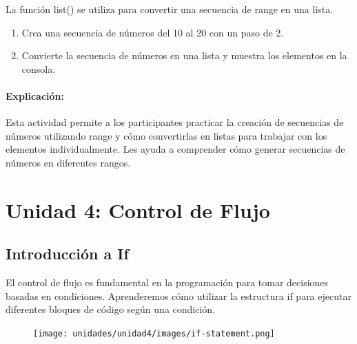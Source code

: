 \documentclass[
  a4paper,
  DIV=11,
  numbers=noendperiod,
  onepage,
  openany]{scrreprt}
\providecommand{\tightlist}{%
  \setlength{\itemsep}{0pt}\setlength{\parskip}{0pt}}\usepackage{longtable,booktabs,array}
\begin{document}
La función list() se utiliza para convertir una secuencia de range en
una lista.

\begin{tcolorbox}[enhanced jigsaw, leftrule=.75mm, bottomtitle=1mm, title=\textcolor{quarto-callout-tip-color}{\faLightbulb}\hspace{0.5em}{Actividad Práctica}, colbacktitle=quarto-callout-tip-color!10!white, coltitle=black, bottomrule=.15mm, colframe=quarto-callout-tip-color-frame, titlerule=0mm, opacityback=0, rightrule=.15mm, toptitle=1mm, opacitybacktitle=0.6, arc=.35mm, breakable, colback=white, toprule=.15mm, left=2mm]

\begin{enumerate}
\def\labelenumi{\arabic{enumi}.}
\tightlist
\item
  Crea una secuencia de números del 10 al 20 con un paso de 2.
\item
  Convierte la secuencia de números en una lista y muestra los elementos
  en la consola.
\end{enumerate}

\end{tcolorbox}

\subsection{Explicación:}\label{explicaciuxf3n-15}

Esta actividad permite a los participantes practicar la creación de
secuencias de números utilizando range y cómo convertirlas en listas
para trabajar con los elementos individualmente. Les ayuda a comprender
cómo generar secuencias de números en diferentes rangos.

\part{Unidad 4: Control de Flujo}

\chapter{Introducción a If}\label{introducciuxf3n-a-if}

El control de flujo es fundamental en la programación para tomar
decisiones basadas en condiciones. Aprenderemos cómo utilizar la
estructura if para ejecutar diferentes bloques de código según una
condición.

\begin{figure}

{\centering \texttt{[image: unidades/unidad4/images/if-statement.png]}

}

\end{figure}
\end{document}
